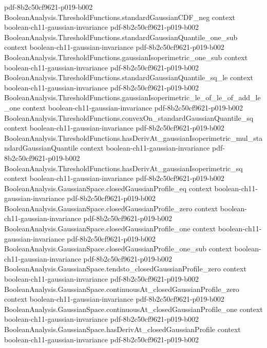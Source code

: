 \begin{lemma}
  {pdf-8b2c50cf9621-p019-b002}
\proofstep
  {BooleanAnalysis.ThresholdFunctions.standardGaussianCDF_neg}
  {context}
  {boolean-ch11-gaussian-invariance}
  {pdf-8b2c50cf9621-p019-b002}
\proofstep
  {BooleanAnalysis.ThresholdFunctions.standardGaussianQuantile_one_sub}
  {context}
  {boolean-ch11-gaussian-invariance}
  {pdf-8b2c50cf9621-p019-b002}
\proofstep
  {BooleanAnalysis.ThresholdFunctions.gaussianIsoperimetric_one_sub}
  {context}
  {boolean-ch11-gaussian-invariance}
  {pdf-8b2c50cf9621-p019-b002}
\proofstep
  {BooleanAnalysis.ThresholdFunctions.standardGaussianQuantile_sq_le}
  {context}
  {boolean-ch11-gaussian-invariance}
  {pdf-8b2c50cf9621-p019-b002}
\proofstep
  {BooleanAnalysis.ThresholdFunctions.gaussianIsoperimetric_le_of_le_of_add_le_one}
  {context}
  {boolean-ch11-gaussian-invariance}
  {pdf-8b2c50cf9621-p019-b002}
\proofstep
  {BooleanAnalysis.ThresholdFunctions.convexOn_standardGaussianQuantile_sq}
  {context}
  {boolean-ch11-gaussian-invariance}
  {pdf-8b2c50cf9621-p019-b002}
\proofstep
  {BooleanAnalysis.ThresholdFunctions.hasDerivAt_gaussianIsoperimetric_mul_standardGaussianQuantile}
  {context}
  {boolean-ch11-gaussian-invariance}
  {pdf-8b2c50cf9621-p019-b002}
\proofstep
  {BooleanAnalysis.ThresholdFunctions.hasDerivAt_gaussianIsoperimetric_sq}
  {context}
  {boolean-ch11-gaussian-invariance}
  {pdf-8b2c50cf9621-p019-b002}
\proofstep
  {BooleanAnalysis.GaussianSpace.closedGaussianProfile_eq}
  {context}
  {boolean-ch11-gaussian-invariance}
  {pdf-8b2c50cf9621-p019-b002}
\proofstep
  {BooleanAnalysis.GaussianSpace.closedGaussianProfile_zero}
  {context}
  {boolean-ch11-gaussian-invariance}
  {pdf-8b2c50cf9621-p019-b002}
\proofstep
  {BooleanAnalysis.GaussianSpace.closedGaussianProfile_one}
  {context}
  {boolean-ch11-gaussian-invariance}
  {pdf-8b2c50cf9621-p019-b002}
\proofstep
  {BooleanAnalysis.GaussianSpace.closedGaussianProfile_one_sub}
  {context}
  {boolean-ch11-gaussian-invariance}
  {pdf-8b2c50cf9621-p019-b002}
\proofstep
  {BooleanAnalysis.GaussianSpace.tendsto_closedGaussianProfile_zero}
  {context}
  {boolean-ch11-gaussian-invariance}
  {pdf-8b2c50cf9621-p019-b002}
\proofstep
  {BooleanAnalysis.GaussianSpace.continuousAt_closedGaussianProfile_zero}
  {context}
  {boolean-ch11-gaussian-invariance}
  {pdf-8b2c50cf9621-p019-b002}
\proofstep
  {BooleanAnalysis.GaussianSpace.continuousAt_closedGaussianProfile_one}
  {context}
  {boolean-ch11-gaussian-invariance}
  {pdf-8b2c50cf9621-p019-b002}
\proofstep
  {BooleanAnalysis.GaussianSpace.hasDerivAt_closedGaussianProfile}
  {context}
  {boolean-ch11-gaussian-invariance}
  {pdf-8b2c50cf9621-p019-b002}

\end{lemma}
